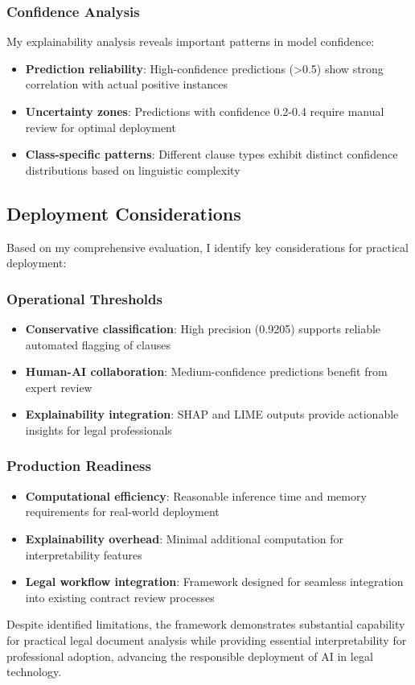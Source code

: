 \subsubsection{Confidence Analysis}
My explainability analysis reveals important patterns in model confidence:

\begin{itemize}
\item \textbf{Prediction reliability}: High-confidence predictions (>0.5) show strong correlation with actual positive instances
\item \textbf{Uncertainty zones}: Predictions with confidence 0.2-0.4 require manual review for optimal deployment
\item \textbf{Class-specific patterns}: Different clause types exhibit distinct confidence distributions based on linguistic complexity
\end{itemize}

\subsection{Deployment Considerations}
\label{subsec:deployment}

Based on my comprehensive evaluation, I identify key considerations for practical deployment:

\subsubsection{Operational Thresholds}
\begin{itemize}
\item \textbf{Conservative classification}: High precision (0.9205) supports reliable automated flagging of clauses
\item \textbf{Human-AI collaboration}: Medium-confidence predictions benefit from expert review
\item \textbf{Explainability integration}: SHAP and LIME outputs provide actionable insights for legal professionals
\end{itemize}

\subsubsection{Production Readiness}
\begin{itemize}
\item \textbf{Computational efficiency}: Reasonable inference time and memory requirements for real-world deployment
\item \textbf{Explainability overhead}: Minimal additional computation for interpretability features
\item \textbf{Legal workflow integration}: Framework designed for seamless integration into existing contract review processes
\end{itemize}

Despite identified limitations, the framework demonstrates substantial capability for practical legal document analysis while providing essential interpretability for professional adoption, advancing the responsible deployment of AI in legal technology.